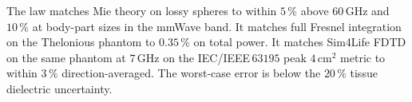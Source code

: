 \documentclass[journal,twocolumn,10pt]{IEEEtran}
\theoremstyle{plain}
\theoremstyle{remark}
\begin{document}
The law matches Mie theory on lossy spheres to within $5\,\%$
above $60\,$GHz and $10\,\%$ at body-part sizes in the mmWave band.
It matches full Fresnel integration on the Thelonious phantom to
$0.35\,\%$ on total power. It matches Sim4Life FDTD on the same
phantom at $7\,$GHz on the IEC/IEEE\,$63195$ peak
$4\,\mathrm{cm}^2$ metric to within $3\,\%$ direction-averaged. The
worst-case error is below the $20\,\%$ tissue dielectric
uncertainty.




\end{document}
